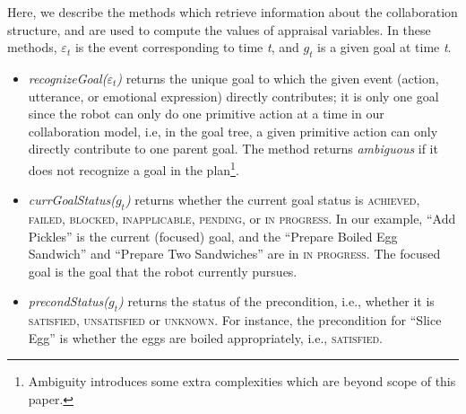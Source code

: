 \documentclass{article}
\begin{document}

Here, we describe the methods which retrieve information about the collaboration
structure, and are used to compute the values of appraisal variables. In these
methods, $\varepsilon_t$ is the event corresponding to time \textit{t}, and
$g_t$ is a given goal at time \textit{t}.

\begin{itemize}[leftmargin=2pt]
  \setlength\itemsep{0.2mm}
  \item \textit{recognizeGoal($\varepsilon_t$)} returns the unique goal to which
  the given event (action, utterance, or emotional expression) directly
  contributes; it is only one goal since the robot can only do one primitive
  action at a time in our collaboration model, i.e, in the goal tree, a given
  primitive action can only directly contribute to one parent goal. The method
  returns \textit{ambiguous} if it does not recognize a goal in the
  plan\footnote{Ambiguity introduces some extra complexities which are beyond
  scope of this paper.}.
   
  
  \item \textit{currGoalStatus($g_t$)} returns whether the current goal status 
  is \textsc{achieved, failed, blocked, inapplicable, pending,} or \textsc{in
  progress}. In our example, ``Add Pickles'' is the current (focused) goal, and
  the ``Prepare Boiled Egg Sandwich'' and ``Prepare Two Sandwiches'' are in
  \textsc{in progress}. The focused goal is the goal that the robot currently
  pursues.
  
  \item \textit{precondStatus($g_t$)} returns the status of the precondition,
  i.e., whether it is \textsc{satisfied, unsatisfied} or \textsc{unknown}. For
  instance, the precondition for ``Slice Egg'' is whether the eggs are boiled
  appropriately, i.e., \textsc{satisfied}.
  

\end{itemize}
\end{document}
